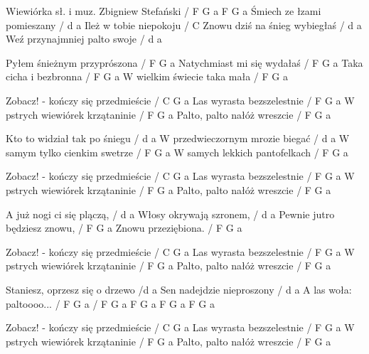 Wiewiórka
sł. i muz. Zbigniew Stefański
/ F G a F G a
Śmiech ze łzami pomieszany / d a
Ileż w tobie niepokoju / C
Znowu dziś na śnieg wybiegłaś / d a
Weź przynajmniej palto swoje / d a

Pyłem śnieżnym przyprószona / F G a
Natychmiast mi się wydałaś / F G a
Taka cicha i bezbronna / F G a
W wielkim świecie taka mała / F G a

Zobacz! - kończy się przedmieście / C G a
Las wyrasta bezszelestnie / F G a
W pstrych wiewiórek krzątaninie / F G a
Palto, palto nałóż wreszcie / F G a

Kto to widział tak po śniegu / d a
W przedwieczornym mrozie biegać / d a
W samym tylko cienkim swetrze / F G a
W samych lekkich pantofelkach / F G a

Zobacz! - kończy się przedmieście / C G a
Las wyrasta bezszelestnie / F G a
W pstrych wiewiórek krzątaninie / F G a
Palto, palto nałóż wreszcie / F G a

A już nogi ci się plączą, / d a
Włosy okrywają szronem, / d a
Pewnie jutro będziesz znowu, / F G a
Znowu przeziębiona. / F G a

Zobacz! - kończy się przedmieście / C G a
Las wyrasta bezszelestnie / F G a
W pstrych wiewiórek krzątaninie / F G a
Palto, palto nałóż wreszcie / F G a

Staniesz, oprzesz się o drzewo /d a
Sen nadejdzie nieproszony / d a
A las woła: paltoooo... / F G a
/ F G a F G a F G a F G a

Zobacz! - kończy się przedmieście / C G a
Las wyrasta bezszelestnie / F G a
W pstrych wiewiórek krzątaninie / F G a
Palto, palto nałóż wreszcie / F G a